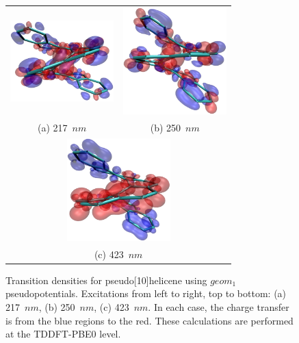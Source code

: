 \documentclass[aip,reprint,nofootinbib]{revtex4-1}
\begin{document}
\begin{figure}
\begin{tabular}{cc}
\includegraphics[width=4cm]{psh10-pk1} &
\includegraphics[width=4cm]{psh10-pk2} \\
(a) 217~$nm$ & (b) 250~$nm$ \\
\multicolumn{2}{c}{\includegraphics[width=4cm]{psh10-pk3}} \\
\multicolumn{2}{c}{(c) 423~$nm$}\\
\end{tabular}
\caption[$geom_1$ pseudo{[10]}helicene transition densities.]{Transition densities for pseudo[10]helicene using $geom_1$ pseudopotentials. Excitations from left to right, top to bottom: (a) 217~$nm$, (b) 250~$nm$, (c) 423~$nm$. In each case, the charge transfer is from the blue regions to the red. These calculations are performed at the TDDFT-PBE0 level.}\label{fig:pshelipeaks}
\end{figure}
\end{document}
